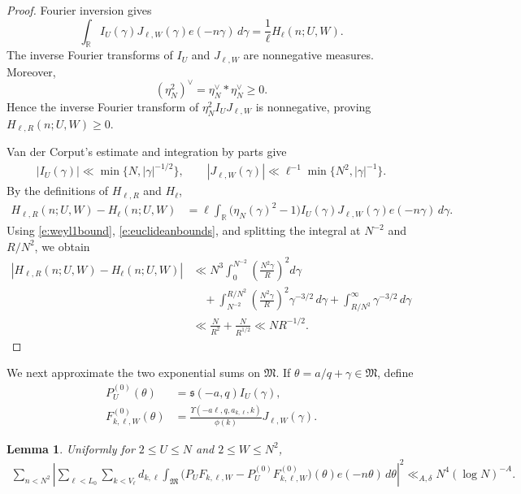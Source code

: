 \documentclass[12pt,reqno]{amsart}
\numberwithin{equation}{section}
\newtheorem{lemma}[equation]{Lemma}
\theoremstyle{definition}
\theoremstyle{remark}
\begin{document}
\begin{proof}
Fourier inversion gives
\[
 \int_{\mathbb R}I_U(\gamma)J_{\ell,W}(\gamma)e(-n\gamma)\,d\gamma
 =\frac1\ell H_\ell(n;U,W).
\]
The inverse Fourier transforms of \(I_U\) and \(J_{\ell,W}\) are
nonnegative measures.  Moreover,
\[
 (\eta_N^2)^\vee
 =\eta_N^\vee*\eta_N^\vee\geq0.
\]
Hence the inverse Fourier transform of
\(\eta_N^2I_UJ_{\ell,W}\) is nonnegative, proving
\(H_{\ell,R}(n;U,W)\geq0\).

Van der Corput's estimate and integration by parts give
\begin{align}\label{e:euclideanbounds}
    |I_U(\gamma)|\ll\min\{N,|\gamma|^{-1/2}\},
 \qquad
 |J_{\ell,W}(\gamma)|
 \ll\ell^{-1}\min\{N^2,|\gamma|^{-1}\}.
\end{align}
By the definitions of \(H_{\ell,R}\) and \(H_\ell\),
\begin{align*}
 H_{\ell,R}(n;U,W)-H_\ell(n;U,W)
 &=
 \ell\int_{\mathbb R}
 \bigl(\eta_N(\gamma)^2-1\bigr)
 I_U(\gamma)J_{\ell,W}(\gamma)e(-n\gamma)\,d\gamma.
\end{align*}
Using \eqref{e:weyl1bound}, \eqref{e:euclideanbounds}, 
and splitting the integral at \(N^{-2}\) and \(R/N^2\), we obtain
\begin{align}\label{e:lrtol}
 |H_{\ell,R}(n;U,W)-H_\ell(n;U,W)|
 &\ll
 N^3\int_0^{N^{-2}}
 \left(\frac{N^2\gamma}{R}\right)^2d\gamma\\
 &\quad+
 \int_{N^{-2}}^{R/N^2}
 \left(\frac{N^2\gamma}{R}\right)^2\gamma^{-3/2}\,d\gamma
 +\int_{R/N^2}^{\infty}\gamma^{-3/2}\,d\gamma\\
 &\ll \frac{N}{R^2}+\frac{N}{R^{1/2}}
 \ll NR^{-1/2}.
\end{align}
\end{proof}

We next approximate the two exponential sums on \(\mathfrak M\).  If
\(\theta=a/q+\gamma\in\mathfrak M\), define
\begin{align*}
 P_U^{(0)}(\theta)
 &=
 \mathfrak s(-a,q)I_U(\gamma),\\
 F_{k,\ell,W}^{(0)}(\theta)
 &=
 \frac{\Upsilon(-a\ell,q,a_{k,\ell},k)}{\phi(k)}
 J_{\ell,W}(\gamma).
\end{align*}



\begin{lemma}
\label{l:majorapproximation9}
Uniformly for \(2\leq U\leq N\) and \(2\leq W\leq N^2\),
\begin{align}\label{e:majorapproximation9}
 \sum_{n<N^2}\left|
 \sum_{\ell<L_0}\sum_{k<V_\ell}d_{k,\ell}
 \int_{\mathfrak M}
 \bigl(P_UF_{k,\ell,W}
 -P_U^{(0)}F_{k,\ell,W}^{(0)}\bigr)(\theta)
 e(-n\theta)\,d\theta
 \right|^2
 \ll_{A,\delta}N^4(\log N)^{-A}.
\end{align}
\end{lemma}
\end{document}
